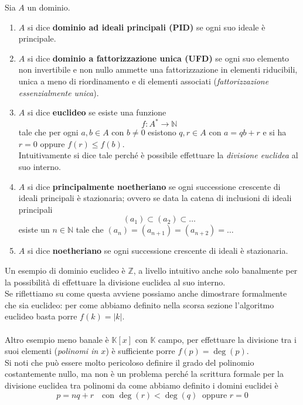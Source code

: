 \begin{definizione}
	Sia $A$ un dominio.
	\begin{enumerate}
		\item $A$ si dice \textbf{dominio ad ideali principali (PID)} se ogni suo ideale è principale.
		\item $A$ si dice \textbf{dominio a fattorizzazione unica (UFD)} se ogni suo elemento non invertibile e non nullo ammette una fattorizzazione in elementi riducibili, unica a meno di riordinamento e di elementi associati (\textit{fattorizzazione essenzialmente unica}).
		\item $A$ si dice \textbf{euclideo} se esiste una funzione 
		\begin{equation*}
		f: A^*\longrightarrow \mathbb{N}
		\end{equation*}
		tale che per ogni $a,b\in A$ con $b \neq 0$ esistono $q,r \in A$ con $a=qb+r$ e si ha $r=0$ oppure $f(r)\leq f(b)$. \\
		Intuitivamente si dice tale perché è possibile effettuare la \textit{divisione euclidea} al suo interno.
		\item $A$ si dice \textbf{principalmente noetheriano} se ogni successione crescente di ideali principali è stazionaria; ovvero se data la catena di inclusioni di ideali principali
		\begin{equation*}
		(a_1)\subset(a_2)\subset \dots
		\end{equation*}
		esiste un $n\in\mathbb{N}$ tale che $(a_n)=(a_{n+1})=(a_{n+2})=\dots$
		\item $A$ si dice \textbf{noetheriano} se ogni successione crescente di ideali è stazionaria.
	\end{enumerate}
\end{definizione}
\begin{esempio}
	Un esempio di dominio euclideo è $\mathbb{Z}$, a livello intuitivo anche solo banalmente per la possibilità di effettuare la divisione euclidea al suo interno. \\ Se riflettiamo su come questa avviene possiamo anche dimostrare formalmente che sia euclideo: per come abbiamo definito nella scorsa sezione l'algoritmo euclideo basta porre $f(k)=|k|$. \\ \\ Altro esempio meno banale è $\mathbb{K}[x]$ con $\mathbb{K}$ campo, per effettuare la divisione tra i suoi elementi (\textit{polinomi in $x$}) è sufficiente porre $f(p)=\deg(p)$. \\ Si noti che può essere molto pericoloso definire il grado del polinomio costantemente nullo, ma non è un problema perché la scrittura formale per la divisione euclidea tra polinomi da come abbiamo definito i domini euclidei è 
	\begin{equation*}
	p=nq+r \ \ \ \text{ con } \deg(r)<\deg(q) \ \text{ oppure } r=0
	\end{equation*}
\end{esempio}




